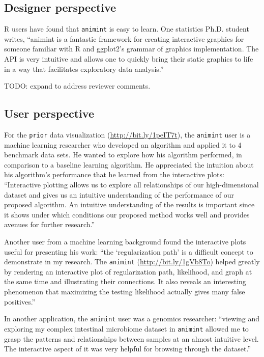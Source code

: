 \documentclass[12pt]{article}\usepackage[]{graphicx}\usepackage[]{color}
\begin{document}
\subsection{Designer perspective}

R users have found that \texttt{animint} is easy to learn. One statistics
Ph.D. student writes, ``animint is a fantastic framework for creating
interactive graphics for someone familiar with R and ggplot2's grammar
of graphics implementation. The API is very intuitive and allows one
to quickly bring their static graphics to life in a way that
facilitates exploratory data analysis.''

TODO: expand to address reviewer comments.

\subsection{User perspective}

For the \texttt{prior} data visualization
(\url{http://bit.ly/1peIT7t}), the \texttt{animint} user is a machine learning
researcher who developed an algorithm and applied it to 4 benchmark
data sets. He wanted to explore how his algorithm performed, in
comparison to a baseline learning algorithm. He appreciated the
intuition about his algorithm's performance that he learned from the
interactive plots: ``Interactive plotting allows us to explore all
relationships of our high-dimensional dataset and gives us an
intuitive understanding of the performance of our proposed
algorithm. An intuitive understanding of the results is important
since it shows under which conditions our proposed method works well
and provides avenues for further research.''

Another user from a machine learning background found the interactive
plots useful for presenting his work: ``the `regularization path' is a
difficult concept to demonstrate in my research. The \texttt{animint}
(\url{http://bit.ly/1gVb8To}) helped greatly by rendering an
interactive plot of regularization path, likelihood, and graph at the
same time and illustrating their connections. It also reveals an
interesting phenomenon that maximizing the testing likelihood actually
gives many false positives.''

In another application, the \texttt{animint} user was a genomics researcher:
``viewing and exploring my complex intestinal microbiome dataset in
\texttt{animint} allowed me to grasp the patterns and relationships between
samples at an almost intuitive level. The interactive aspect of it was
very helpful for browsing through the dataset.''
\end{document}
